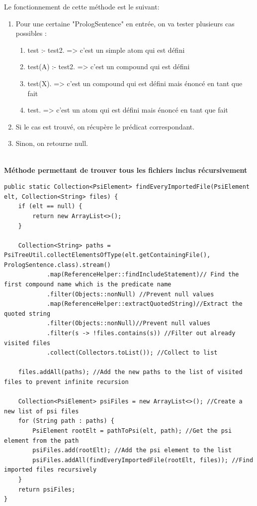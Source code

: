 \noindent Le fonctionnement de cette méthode est le suivant:
\begin{enumerate}
    \item Pour une certaine "PrologSentence" en entrée, on va tester plusieurs cas possibles :
    \begin{enumerate}
        \item test :- test2. => c'est un simple atom qui est défini
        \item test(A) :- test2. => c'est un compound qui est défini
        \item test(X). => c'est un compound qui est défini mais énoncé en tant que fait
        \item test. => c'est un atom qui est défini mais énoncé en tant que fait
    \end{enumerate}
    \item Si le cas est trouvé, on récupère le prédicat correspondant.
    \item Sinon, on retourne null.
\end{enumerate}
\\
\textbf{Méthode permettant de trouver tous les fichiers inclus récursivement}
\begin{lstlisting}[label={lst:method_find_all_included_files}, caption={Méthode permettant de trouver tous les fichiers inclus récursivement}]
public static Collection<PsiElement> findEveryImportedFile(PsiElement elt, Collection<String> files) {
    if (elt == null) {
        return new ArrayList<>();
    }

    Collection<String> paths = PsiTreeUtil.collectElementsOfType(elt.getContainingFile(), PrologSentence.class).stream()
            .map(ReferenceHelper::findIncludeStatement)// Find the first compound name which is the predicate name
            .filter(Objects::nonNull) //Prevent null values
            .map(ReferenceHelper::extractQuotedString)//Extract the quoted string
            .filter(Objects::nonNull)//Prevent null values
            .filter(s -> !files.contains(s)) //Filter out already visited files
            .collect(Collectors.toList()); //Collect to list

    files.addAll(paths); //Add the new paths to the list of visited files to prevent infinite recursion

    Collection<PsiElement> psiFiles = new ArrayList<>(); //Create a new list of psi files
    for (String path : paths) {
        PsiElement rootElt = pathToPsi(elt, path); //Get the psi element from the path
        psiFiles.add(rootElt); //Add the psi element to the list
        psiFiles.addAll(findEveryImportedFile(rootElt, files)); //Find imported files recursively
    }
    return psiFiles;
}
\end{lstlisting}

